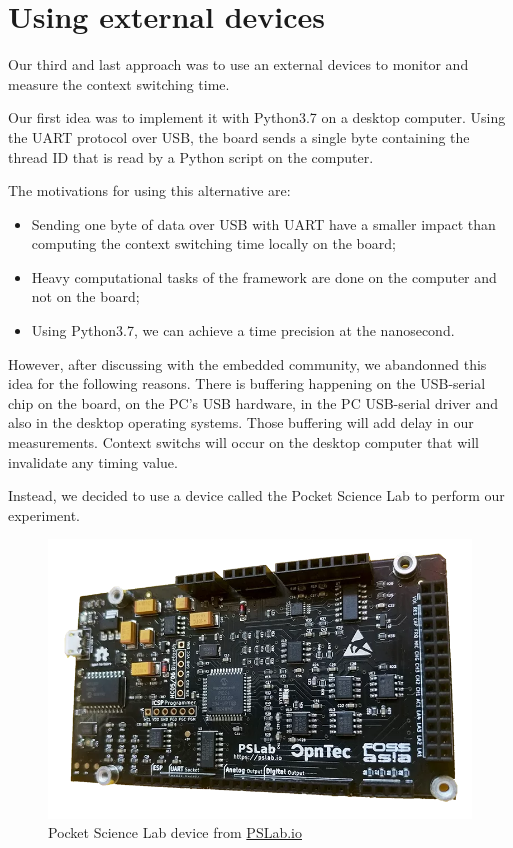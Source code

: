 \section{Using external devices \label{sec:external}}

Our third and last approach was to use an external devices to monitor and measure the context switching time.

Our first idea was to implement it with Python3.7 on a desktop computer.
Using the UART protocol over USB, the board sends a single byte containing the thread ID that is read by a Python script on the computer.

The motivations for using this alternative are:
\begin{itemize}
  \item Sending one byte of data over USB with UART have a smaller impact than computing the context switching time locally on the board;
  \item Heavy computational tasks of the framework are done on the computer and not on the board;
  \item Using Python3.7, we can achieve a time precision at the nanosecond.
\end{itemize}

However, after discussing with the embedded community, we abandonned this idea for the following reasons.
There is buffering happening on the USB-serial chip on the board, on the PC's USB hardware, in the PC USB-serial driver and also in the desktop operating systems.
Those buffering will add delay in our measurements.
Context switchs will occur on the desktop computer that will invalidate any timing value.

Instead, we decided to use a device called the Pocket Science Lab to perform our experiment.

\begin{figure}[!ht]
  \centering
  \includegraphics[scale=0.25]{assets/pslab.png}
  \caption{\label{fig:pslab}Pocket Science Lab device from \href{https://pslab.io}{PSLab.io}}
\end{figure}

